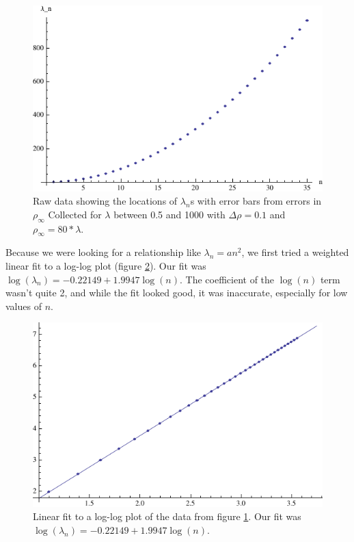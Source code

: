 \documentclass[12pt,twoside]{reedthesis}
\begin{document}
\begin{figure}[h]
\centering
\includegraphics{Figures/rawdata}
\caption[Raw data for spherically symmetric $\lambda_n$s]{Raw data showing the locations of $\lambda_n$s with error bars from errors in $\rho_{\infty}$ Collected for $\lambda$ between 0.5 and 1000 with $\Delta \rho = 0.1$ and $\rho_{\infty} = 80*\lambda$.}
\label{fig:rawdata}
\end{figure}

Because we were looking for a relationship like $\lambda_n = a n^2$, we first tried a weighted linear fit to a log-log plot (figure \ref{fig:loglog}). Our fit was $\log(\lambda_n) = -0.22149 + 1.9947 \log(n)$. The coefficient of the $\log(n)$ term wasn't quite 2, and while the fit looked good, it was inaccurate, especially for low values of $n$. 
\begin{figure}[h]
\centering
\includegraphics{Figures/loglog}
\caption[Log-log fit]{Linear fit to a log-log plot of the data from figure \ref{fig:rawdata}. Our fit was $\log(\lambda_n) = -0.22149 + 1.9947 \log(n)$.}
\label{fig:loglog}
\end{figure}
\end{document}
